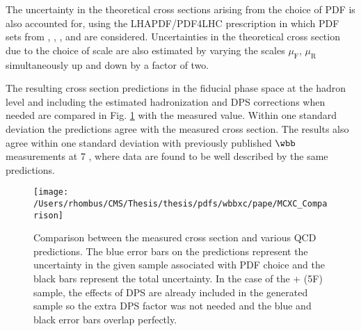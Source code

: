 The uncertainty in the theoretical cross sections arising
 from the choice of PDF is also accounted for,
 using the LHAPDF/PDF4LHC \cite{LHAPDF,Botje:2011sn,Alekhin:2011sk,Ball:2012cx}
 prescription in which
 PDF sets from \CTEQ, \MSTW, \NNPDF, and \HERA are considered.
Uncertainties in the theoretical cross section due to the
 choice of scale are also estimated by varying the scales
 $\mu_{\mathrm{F}}$, $\mu_{\mathrm{R}}$ simultaneously
 up and down by a factor of two.

The resulting cross section predictions in the fiducial
 phase space at the hadron level and including the estimated
 hadronization and DPS corrections when needed
 are compared in Fig. \ref{fig:xc_comparison}
 with the measured value.
Within one standard deviation the predictions agree with the measured cross section.
The results also agree within one standard deviation with previously published $\wbb$
 measurements at 7 \TeV, where
 data are found to be well described by the same predictions.

\begin{figure}[htbp]
\center
\texttt{[image: /Users/rhombus/CMS/Thesis/thesis/pdfs/wbbxc/pape/MCXC\_Comparison]}
\caption{
 Comparison between the measured \wbb cross section and
  various QCD predictions.
 The blue error bars on the predictions represent the uncertainty in
  the given sample associated with PDF choice and
  the black bars represent the total uncertainty.
 In the case of the \MADGRAPH + \PYTHIAs (5F) sample,
  the effects of DPS are already included in the generated
  sample so the extra DPS factor was not needed and the blue
  and black error bars overlap perfectly.
 }
\label{fig:xc_comparison}
\end{figure}

